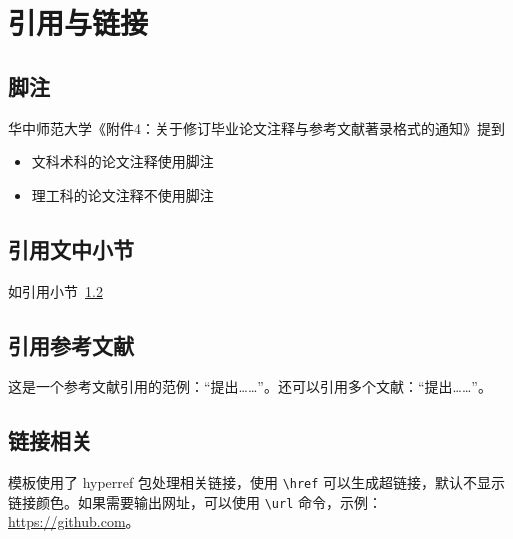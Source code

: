 
\chapter{引用与链接}

\section{脚注}

华中师范大学《附件4：关于修订毕业论文注释与参考文献著录格式的通知》提到

\begin{itemize}
  \item 文科术科的论文注释使用脚注
  \item 理工科的论文注释不使用脚注
\end{itemize}



\section{引用文中小节}\label{sec:ref}

如引用小节~\ref{sec:ref}



\section{引用参考文献}

这是一个参考文献引用的范例：“\parencite{邱泽奇建构与分化}提出……”。还可以引用多个文献：“\parencite{丁文祥rawtype,李晓东rawtype}提出……”。


\section{链接相关}


模板使用了 hyperref 包处理相关链接，使用 \verb|\href| 可以生成超链接，默认不显示链接颜色。如果需要输出网址，可以使用 \verb|\url| 命令，示例：\url{https://github.com}。